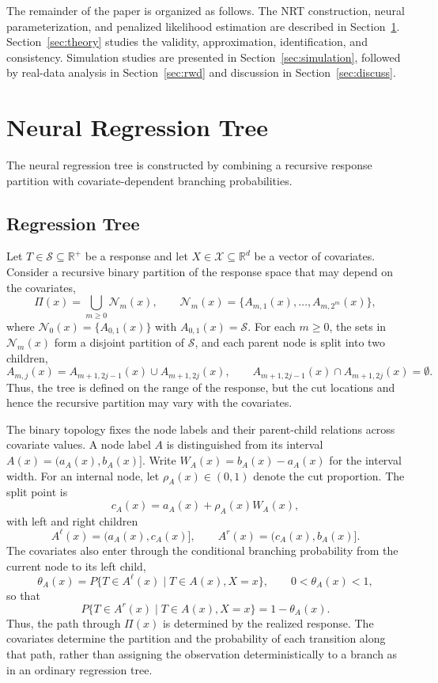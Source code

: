 \documentclass[11pt]{article}
\numberwithin{equation}{section}
\begin{document}
The remainder of the paper is organized as follows. The NRT construction, neural parameterization, and penalized likelihood estimation are described in Section~\ref{sec:NRT}. Section~\ref{sec:theory} studies the validity, approximation, identification, and consistency. Simulation studies are presented in Section~\ref{sec:simulation}, followed by real-data analysis in Section~\ref{sec:rwd} and discussion in Section~\ref{sec:discuss}. 

\section{Neural Regression Tree}
\label{sec:NRT}
The neural regression tree is constructed by combining a recursive response partition with covariate-dependent branching probabilities.

\subsection{Regression Tree}
\label{section-regression-tree}
Let $T\in\mathcal{S}\subseteq\mathbb{R}^+$ be a response and let $X\in\mathcal{X}\subseteq\mathbb{R}^d$ be a vector of covariates. Consider a recursive binary partition of the response space that may depend on the covariates,
$$
    \Pi(x)=\bigcup_{m\geq0}\mathcal{N}_m(x),
    \qquad
    \mathcal{N}_m(x)=\{A_{m,1}(x),\ldots,A_{m,2^m}(x)\},
$$
where $\mathcal{N}_0(x)=\{A_{0,1}(x)\}$ with $A_{0,1}(x)=\mathcal{S}$. For each $m\geq0$, the sets in $\mathcal{N}_m(x)$ form a disjoint partition of $\mathcal{S}$, and each parent node is split into two children,
$$
    A_{m,j}(x)=A_{m+1,2j-1}(x)\cup A_{m+1,2j}(x),
    \qquad
    A_{m+1,2j-1}(x)\cap A_{m+1,2j}(x)=\emptyset .
$$
Thus, the tree is defined on the range of the response, but the cut locations and hence the recursive partition may vary with the covariates.

The binary topology fixes the node labels and their parent-child relations across covariate values. A node label $A$ is distinguished from its interval $A(x)=(a_A(x),b_A(x)]$. Write $W_A(x)=b_A(x)-a_A(x)$ for the interval width. For an internal node, let $\rho_A(x)\in(0,1)$ denote the cut proportion. The split point is
$$
    c_A(x)=a_A(x)+\rho_A(x)W_A(x),
$$
with left and right children
$$
    A^\ell(x)=(a_A(x),c_A(x)],
    \qquad
    A^r(x)=(c_A(x),b_A(x)].
$$
The covariates also enter through the conditional branching probability from the current node to its left child,
$$
    \theta_A(x)
    =
    P\{T\in A^\ell(x)\mid T\in A(x),X=x\},
    \qquad 0<\theta_A(x)<1,
$$
so that
$$
    P\{T\in A^r(x)\mid T\in A(x),X=x\}=1-\theta_A(x).
$$
Thus, the path through $\Pi(x)$ is determined by the realized response. The covariates determine the partition and the probability of each transition along that path, rather than assigning the observation deterministically to a branch as in an ordinary regression tree.
\end{document}

